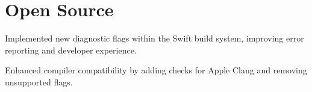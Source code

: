 \documentclass{fonts}
\begin{document}

\section{Open Source}

\textbf{}
\begin{tightemize}
    \item Implemented new diagnostic flags within the Swift build system, improving error reporting and developer experience.
    \item Enhanced compiler compatibility by adding checks for Apple Clang and removing unsupported flags.
\end{tightemize}
\sectionsep



\end{document}
